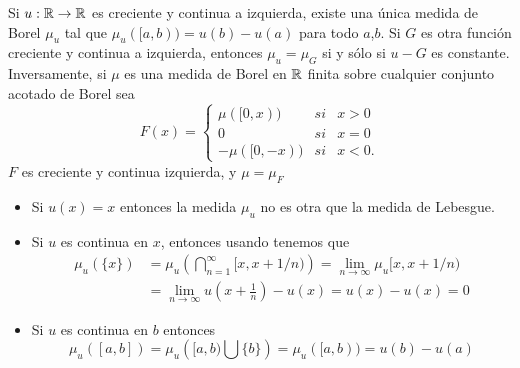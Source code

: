 \begin{thm}\label{medidas}
	Si $u:\mathbb{R} \to\mathbb{R}$ es creciente y continua a izquierda, existe una única medida de Borel $\mu_{u}$ tal que $\mu_{u}([a,b))=u(b)-u(a)$ para todo $a$,$b$. Si $G$ es otra función creciente y continua a izquierda, entonces  $\mu_{u}=\mu_{G}$ si y sólo si $u-G$ es constante. Inversamente, si $\mu$ es una medida de Borel  en $\mathbb{R}$ finita sobre cualquier conjunto acotado de Borel sea
	$$F(x)= \left\{ \begin{array}{lcc}
		\mu([0,x)) &   si  & x > 0 \\
		0 &   si  & x = 0 \\
		-\mu([0,-x)) &   si  & x < 0. 
	\end{array}
	\right. $$
	$F$ es creciente y continua izquierda, y $\mu=\mu_{F}$
\end{thm}  




%

\begin{obs}
	\begin{itemize} 
		\item Si $u(x)=x$ entonces la medida $\mu_{u}$ no es otra que la medida de Lebesgue.
		\item Si $u$ es continua   en $x$, entonces usando  \cite[Teorema 3.28]{Zo} tenemos que 		
		\begin{equation*}
            \begin{split}
			\mu_{u}(\{x\})&=\mu_{u}\left( \bigcap_{n=1}^{\infty}[x,x+1/n)\right) =\lim_{n \to \infty}\mu_{u}[x,x+1/n)
			\\ &=\lim_{n \to \infty}u(x+\frac{1}{n})-u(x)=u(x)-u(x)=0
            \end{split}
		\end{equation*}
		
		\item  Si $u$ es continua  en $b$ entonces 
		$$\mu_{u}([a,b])=\mu_{u}\left([a,b) \bigcup\{b\}\right)=\mu_{u}([a,b))=u(b)-u(a)$$		
	\end{itemize}
\end{obs}

